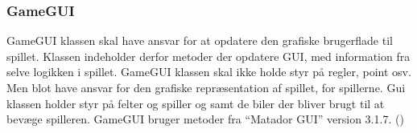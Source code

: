 \subsubsection{GameGUI}
GameGUI klassen skal have ansvar for at opdatere den grafiske brugerflade til
spillet. Klassen indeholder derfor metoder der opdatere GUI, med information fra selve logikken i spillet. GameGUI klassen skal ikke holde styr på regler, point osv. Men blot have ansvar for den grafiske repræsentation af spillet, for spillerne. Gui klassen holder styr på felter og spiller og samt de biler der bliver brugt til at bevæge spilleren. GameGUI bruger metoder fra “Matador GUI” version 3.1.7. (\cite{budtz_diplomit-dtumatador_gui_2020})

